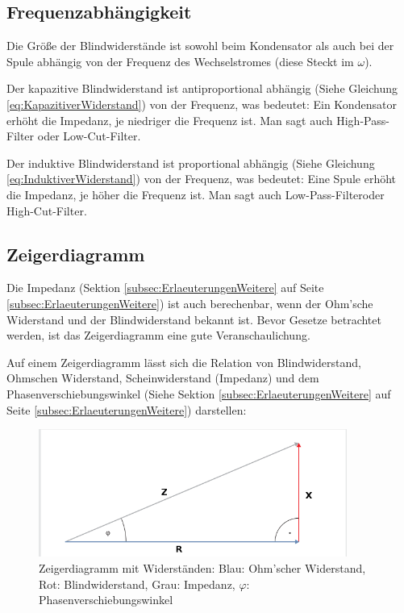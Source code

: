\subsection{Frequenzabhängigkeit}	\label{subsec:Frequenzabhaengigkeit}

Die Größe der Blindwiderstände ist sowohl beim Kondensator als auch bei der Spule abhängig von der Frequenz des Wechselstromes (diese Steckt im $\omega$).

Der kapazitive Blindwiderstand ist antiproportional abhängig (Siehe Gleichung \ref{eq:KapazitiverWiderstand}) von der Frequenz, was bedeutet: \glqq Ein Kondensator erhöht die Impedanz, je niedriger die Frequenz ist.\grqq{} Man sagt auch \glqq High-Pass-Filter\grqq{} oder \glqq Low-Cut-Filter\grqq .

Der induktive Blindwiderstand ist proportional abhängig (Siehe Gleichung \ref{eq:InduktiverWiderstand}) von der Frequenz, was bedeutet: \glqq Eine Spule erhöht die Impedanz, je höher die Frequenz ist.\grqq{} Man sagt auch \glqq Low-Pass-Filter\grqq oder \glqq High-Cut-Filter\grqq .



\subsection{Zeigerdiagramm}	\label{subsec:WiderstaendeZeigerdiagram}

Die Impedanz (Sektion \ref{subsec:ErlaeuterungenWeitere} auf Seite \ref{subsec:ErlaeuterungenWeitere}) ist auch berechenbar, wenn der Ohm'sche Widerstand und der Blindwiderstand bekannt ist. Bevor Gesetze betrachtet werden, ist das Zeigerdiagramm eine gute Veranschaulichung.

Auf einem Zeigerdiagramm lässt sich die Relation von Blindwiderstand, Ohmschen Widerstand, Scheinwiderstand (Impedanz) und dem Phasenverschiebungswinkel (Siehe Sektion \ref{subsec:ErlaeuterungenWeitere} auf Seite \ref{subsec:ErlaeuterungenWeitere}) darstellen:

\begin{figure}[h!]
	\centering
	\includegraphics[width=0.9\textwidth]{Pictures/Zeigerdiagramm}
	\caption{Zeigerdiagramm mit Widerständen: Blau: Ohm'scher Widerstand, Rot: Blindwiderstand, Grau: Impedanz, $\varphi$: Phasenverschiebungswinkel}
	\footnotemark
\end{figure}

